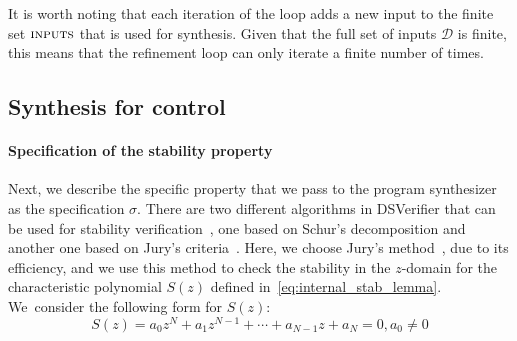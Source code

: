 \documentclass[final]{sig-alternate-05-2015}
\newcommand{\blue}[1]{{\color{blue}#1}}
\newcommand{\red}[1]{{\color{red}#1}}
\begin{document}

It is
worth noting that each iteration of the loop adds a new input to the
finite set $\text{\sc inputs}$ that is used for synthesis.  Given that
the full set of inputs $\mathcal{D}$
is finite, this means that the refinement loop
can only iterate a finite number of times.

\subsection{Synthesis for control}
\label{synthesis-elements}

\paragraph{Specification of the stability property}

Next, we describe the specific property that we pass to the program
synthesizer as the specification $\sigma$.  There are two different
algorithms in DSVerifier that can be used for stability
verification~\cite{daes20161, Bessa16}, one based on Schur's decomposition
and another one based on Jury's criteria~\cite{astrom1997computer}.  Here,
we choose Jury's method~\cite{astrom1997computer}, due to its efficiency,
and we use this method to check the stability in the $z$-domain for the
characteristic polynomial $S(z)$ defined in~\eqref{eq:internal_stab_lemma}.
%
%
We~consider the following form for $S(z)$:
%
$$
S(z) = a_0z^N+a_1z^{N-1}+\cdots+a_{N-1}z+a_N=0, a_0\neq0
$$
%

\end{document}
